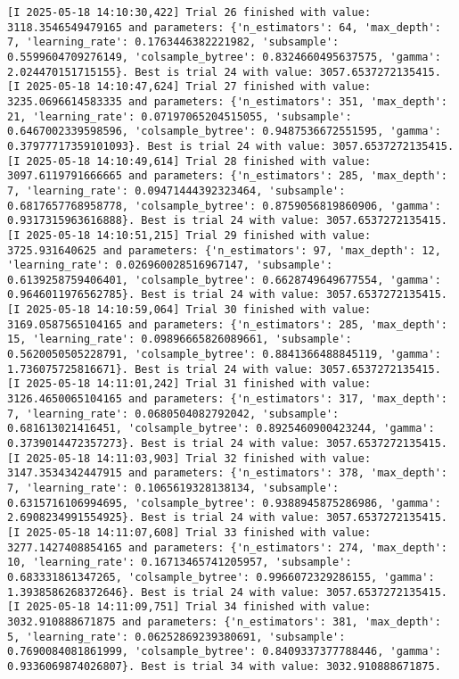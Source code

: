 \documentclass[
  letterpaper,
  DIV=11,
  numbers=noendperiod]{scrreprt}
\begin{document}
\begin{verbatim}
[I 2025-05-18 14:10:30,422] Trial 26 finished with value: 3118.3546549479165 and parameters: {'n_estimators': 64, 'max_depth': 7, 'learning_rate': 0.1763446382221982, 'subsample': 0.5599604709276149, 'colsample_bytree': 0.8324660495637575, 'gamma': 2.024470151715155}. Best is trial 24 with value: 3057.6537272135415.
[I 2025-05-18 14:10:47,624] Trial 27 finished with value: 3235.0696614583335 and parameters: {'n_estimators': 351, 'max_depth': 21, 'learning_rate': 0.07197065204515055, 'subsample': 0.6467002339598596, 'colsample_bytree': 0.9487536672551595, 'gamma': 0.37977717359101093}. Best is trial 24 with value: 3057.6537272135415.
[I 2025-05-18 14:10:49,614] Trial 28 finished with value: 3097.6119791666665 and parameters: {'n_estimators': 285, 'max_depth': 7, 'learning_rate': 0.09471444392323464, 'subsample': 0.6817657768958778, 'colsample_bytree': 0.8759056819860906, 'gamma': 0.9317315963616888}. Best is trial 24 with value: 3057.6537272135415.
[I 2025-05-18 14:10:51,215] Trial 29 finished with value: 3725.931640625 and parameters: {'n_estimators': 97, 'max_depth': 12, 'learning_rate': 0.026960028516967147, 'subsample': 0.6139258759406401, 'colsample_bytree': 0.6628749649677554, 'gamma': 0.9646011976562785}. Best is trial 24 with value: 3057.6537272135415.
[I 2025-05-18 14:10:59,064] Trial 30 finished with value: 3169.0587565104165 and parameters: {'n_estimators': 285, 'max_depth': 15, 'learning_rate': 0.09896665826089661, 'subsample': 0.5620050505228791, 'colsample_bytree': 0.8841366488845119, 'gamma': 1.736075725816671}. Best is trial 24 with value: 3057.6537272135415.
[I 2025-05-18 14:11:01,242] Trial 31 finished with value: 3126.4650065104165 and parameters: {'n_estimators': 317, 'max_depth': 7, 'learning_rate': 0.0680504082792042, 'subsample': 0.681613021416451, 'colsample_bytree': 0.8925460900423244, 'gamma': 0.3739014472357273}. Best is trial 24 with value: 3057.6537272135415.
[I 2025-05-18 14:11:03,903] Trial 32 finished with value: 3147.3534342447915 and parameters: {'n_estimators': 378, 'max_depth': 7, 'learning_rate': 0.1065619328138134, 'subsample': 0.6315716106994695, 'colsample_bytree': 0.9388945875286986, 'gamma': 2.6908234991554925}. Best is trial 24 with value: 3057.6537272135415.
[I 2025-05-18 14:11:07,608] Trial 33 finished with value: 3277.1427408854165 and parameters: {'n_estimators': 274, 'max_depth': 10, 'learning_rate': 0.16713465741205957, 'subsample': 0.683331861347265, 'colsample_bytree': 0.9966072329286155, 'gamma': 1.3938586268372646}. Best is trial 24 with value: 3057.6537272135415.
[I 2025-05-18 14:11:09,751] Trial 34 finished with value: 3032.910888671875 and parameters: {'n_estimators': 381, 'max_depth': 5, 'learning_rate': 0.06252869239380691, 'subsample': 0.7690084081861999, 'colsample_bytree': 0.8409337377788446, 'gamma': 0.9336069874026807}. Best is trial 34 with value: 3032.910888671875.

\end{verbatim}
\end{document}
